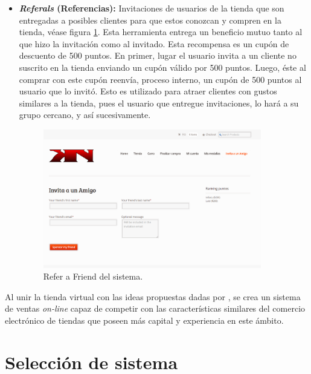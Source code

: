 \begin{itemize}
    \item {\bf \emph{Referals} (Referencias):}
        Invitaciones de usuarios de la tienda que son entregadas a posibles
        clientes para que estos conozcan y compren en la tienda, véase figura 
	\ref{fig:referal}.
        Esta herramienta entrega un beneficio mutuo tanto al que hizo la invitación
        como al invitado. Esta recompensa es un cupón de descuento de 500 puntos.
        En primer, lugar el usuario invita a un cliente no suscrito en la tienda
        enviando un cupón válido por 500 puntos.
        Luego, éste al comprar con este cupón reenvía,
        proceso interno, un cupón de 500 puntos al usuario que lo invitó.
        Esto es utilizado para atraer clientes con gustos similares
        a la tienda, pues el usuario que entregue invitaciones, lo hará a su
        grupo cercano, y así sucesivamente.

\begin{figure}[!htb]
  \centering
  \includegraphics[width=0.9\textwidth]{images/Tienda/Tienda_referal.png}
  \caption[\emph{Refer a friend} del sistema]{Refer a Friend del sistema.}
  \label{fig:referal}
\end{figure}

\end{itemize}

Al unir la tienda virtual con las ideas propuestas dadas por {\gam}, se crea un
sistema de ventas \emph{on-line} capaz de competir con las características similares del
comercio electrónico de tiendas que poseen más capital y experiencia en este ámbito.

\section{Selección de sistema}

